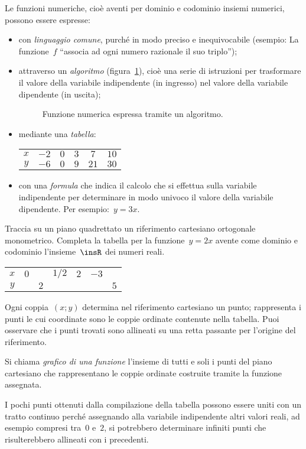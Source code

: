 Le funzioni numeriche, cioè aventi per dominio e codominio insiemi numerici, possono essere espresse:
\begin{itemize}
\item con \emph{linguaggio comune}, purché in modo preciso e inequivocabile (esempio: La funzione~$f$
 ``associa ad ogni numero razionale il suo triplo'');
\item attraverso un \emph{algoritmo} (figura~\ref{fig:8.18}), cioè una serie di istruzioni per trasformare il valore della variabile indipendente
 (in ingresso) nel valore della variabile dipendente (in uscita);
\begin{figure}[hb]
\centering
\caption{Funzione numerica espressa tramite un algoritmo.}\label{fig:8.18}
\end{figure}
\pagebreak
\item mediante una \emph{tabella}:
 \begin{center}
\begin{tabular}{cccccc}
 \toprule
 $x$ & $-2$ & $0$ & $3$ & $7$ & $10$ \\
 $y$ & $-6$ & $0$ & $9$ & $21$ & $30$\\
 \bottomrule
 \end{tabular}
 \end{center}
\item con una \emph{formula} che indica il calcolo che si effettua sulla variabile indipendente per determinare in modo univoco
il valore della variabile dipendente. Per esempio:~$y=3x$.
\end{itemize}

\begin{exrig}
 \begin{esempio}
Traccia su un piano quadrettato un riferimento cartesiano ortogonale monometrico.
Completa la tabella per la funzione~$y=2x$ avente come dominio e codominio l'insieme~$\insR$ dei numeri reali.
\begin{center}
 \begin{tabular}{ccccccc}
 \toprule
 $x$ & $0$ && $1/2$ & $2$ & $-3$ &\\
 $y$ &&$2$&&&&$5$\\
 \bottomrule
 \end{tabular}
\end{center}
Ogni coppia~$(x;y)$ determina nel riferimento cartesiano un punto; rappresenta i punti le cui coordinate sono
le coppie ordinate contenute nella tabella. Puoi osservare che i punti trovati sono allineati su una retta passante
per l'origine del riferimento.
 \end{esempio}
\end{exrig}
\begin{definizione}
 Si chiama \emph{grafico di una funzione} l'insieme di tutti e soli i punti del piano cartesiano che
 rappresentano le coppie ordinate costruite tramite la funzione assegnata.
\end{definizione}
\osservazione
I pochi punti ottenuti dalla compilazione della tabella possono essere uniti con un tratto continuo perché
assegnando alla variabile indipendente altri valori reali, ad esempio compresi tra~$0$ e~$2$, si potrebbero
determinare infiniti punti che risulterebbero allineati con i precedenti.


